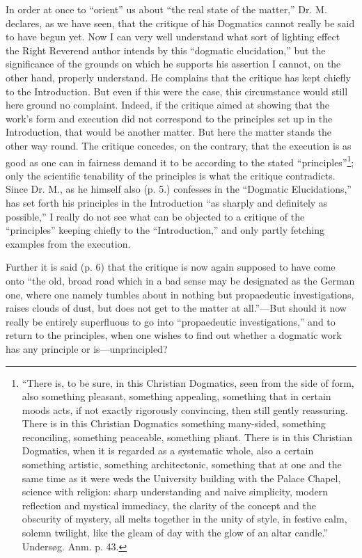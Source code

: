 \documentclass[12pt,a4paper,openany]{book}
\newcommand{\opage}[1]{\marginnote{\footnotesize\textit{[#1]}}}
\begin{document}
In order at once to ``orient'' us about ``the real state
of the matter,'' Dr. M. declares, as we have seen, that the critique
of his Dogmatics cannot really be said to have
begun yet. Now I can very well understand what sort
of lighting effect the Right Reverend author intends by this
``dogmatic elucidation,'' but the significance of the grounds
on which he supports his assertion I cannot, on the other hand, properly
understand. He complains that the critique has kept chiefly
to the Introduction. But even if this were the case,
this circumstance would still here ground no
complaint. Indeed, if the critique aimed at showing that the work's form
\setcounter{footnote}{0}%
\opage{28}and execution did not correspond to the principles set up in the Introduction,
that would be another matter. But here the matter
stands the other way round. The critique concedes, on the contrary,
that the execution is as good as one can in fairness demand it to be according to the stated
``principles''\footnote[1]{``There is, to be sure, in this Christian Dogmatics, seen from the side of form, also something pleasant, something appealing, something that in certain moods acts, if not exactly rigorously convincing, then still gently reassuring. There is in this Christian Dogmatics something many-sided, something reconciling, something peaceable, something pliant. There is in this Christian Dogmatics, when it is regarded as a systematic whole, also a certain something artistic, something architectonic, something that at one and the same time as it were weds the University building with the Palace Chapel, science with religion: sharp understanding and naive simplicity, modern reflection and mystical immediacy, the clarity of the concept and the obscurity of mystery, all melts together in the unity of style, in festive calm, solemn twilight, like the gleam of day with the glow of an altar candle.'' Undersøg. Anm. p. 43.}; only
the scientific tenability of the principles is what the critique
contradicts. Since Dr. M., as he himself also (p. 5.) confesses in the ``Dogmatic Elucidations,''
has set forth his principles in the Introduction
``as sharply and definitely as
possible,'' I really do not see what can be objected
to a critique of the ``principles'' keeping chiefly
to the ``Introduction,'' and only partly fetching
examples from the execution.

Further it is said (p. 6) that the critique is now again supposed
to have come onto ``the old, broad road which in a bad
sense may be designated as the German one, where one namely
tumbles about in nothing but propaedeutic investigations, raises
clouds of dust, but does not get to the matter at all.''---But
should it now really be entirely superfluous to go
into ``propaedeutic investigations,'' and to return to
\setcounter{footnote}{0}%
\opage{29}the principles, when one wishes to find out whether a dogmatic
work has any principle or is---unprincipled?
\end{document}
